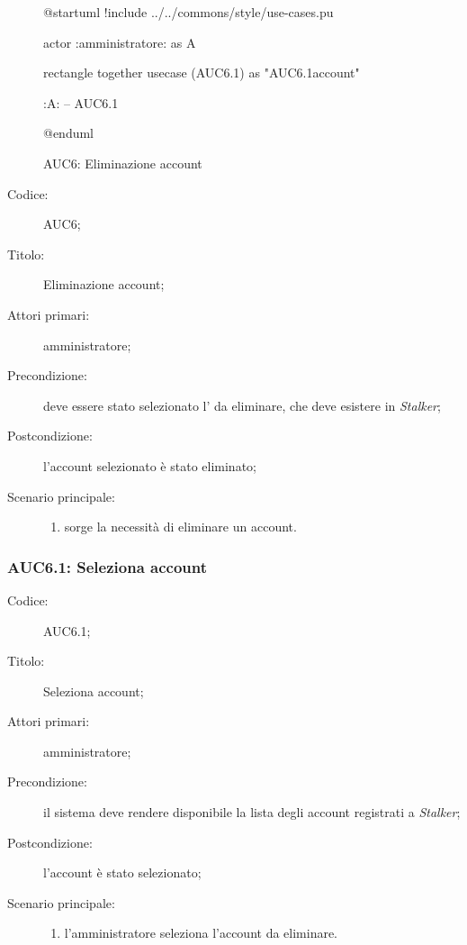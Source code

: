 \documentclass[../../../analisi-dei-requisiti.tex]{subfiles}
\begin{document}
\begin{figure}[H]
  \centering
  \begin{plantuml}
  @startuml
  !include ../../commons/style/use-cases.pu

  actor :amministratore: as A

  rectangle {
    together {
      usecase (AUC6.1) as "AUC6.1\nSeleziona account"
    }
  }

  :A: -- AUC6.1

  @enduml
  \end{plantuml}
  \caption{AUC6: Eliminazione account}%
  \label{fig:auc6}
\end{figure}

\begin{description}
  \item[Codice:] AUC6;
  \item[Titolo:] Eliminazione account;
  \item[Attori primari:] amministratore;
  \item[Precondizione:] deve essere stato selezionato l' da eliminare, che deve esistere in \emph{Stalker};
  \item[Postcondizione:] l'account selezionato è stato eliminato;
  \item[Scenario principale:]
  \begin{enumerate}
    \item sorge la necessità di eliminare un account.
  \end{enumerate}
\end{description}

\subsubsection{AUC6.1: Seleziona account}%
\label{subs:AUC6.1}
\begin{description}
  \item[Codice:] AUC6.1;
  \item[Titolo:] Seleziona account;
  \item[Attori primari:] amministratore;
  \item[Precondizione:] il sistema deve rendere disponibile la lista degli account registrati a \emph{Stalker};
  \item[Postcondizione:] l'account è stato selezionato;
  \item[Scenario principale:]
  \begin{enumerate}
    \item l'amministratore seleziona l'account da eliminare.
  \end{enumerate}
\end{description}
\end{document}
